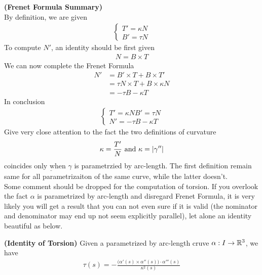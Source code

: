 \documentclass{report}
\begin{document}
\begin{mdframed}
\textbf{(Frenet Formula Summary)} \\

By definition, we are given 
\begin{align*}
\begin{cases}
  T'=\kappa N\\
  B'=\tau N
\end{cases}
\end{align*}
To compute $N'$, an identity should be first given 
 \begin{align*}
N=B\times T
\end{align*}
We can now complete the Frenet Formula 
\begin{align*}
N'&=B'\times T + B \times T'\\
&=\tau N \times T + B \times \kappa N\\
&=-\tau B-\kappa T
\end{align*}
In conclusion 
\begin{align*}
\begin{cases}
  T'=\kappa N
  B' =\tau N\\
  N'=-\tau B-\kappa T
\end{cases}
\end{align*}
Give very close attention to the fact the two definitions of curvature 
\begin{align*}
\kappa =\frac{T'}{N}\text{ and }\kappa = \left|\gamma ''\right|
\end{align*}
coincides $\underline{\text{only when }}\gamma $ is parametrzied by arc-length. The first definition remain same for all parametrizaiton of the same curve, while the latter doesn't.\\

Some comment should be dropped for the computation of torsion. If you overlook the fact $\alpha $ is parametrized by arc-length and disregard Frenet Formula, it is very likely you will get a result that you can not even sure if it is valid (the nominator and denominator may end up not seem explicitly parallel), let alone an identity beautiful as below. 
\end{mdframed}
\begin{theorem}
\textbf{(Identity of Torsion)} Given a parametrized by arc-length cruve $\alpha  :I \rightarrow \mathbb{R}^3$, we have 
\begin{align*}
\tau(s)=-\frac{\big(\alpha '(s)\times \alpha ''(s) \big)\cdot \alpha '''(s)}{\kappa ^2 (s)}
\end{align*}
\end{theorem}
\end{document}
